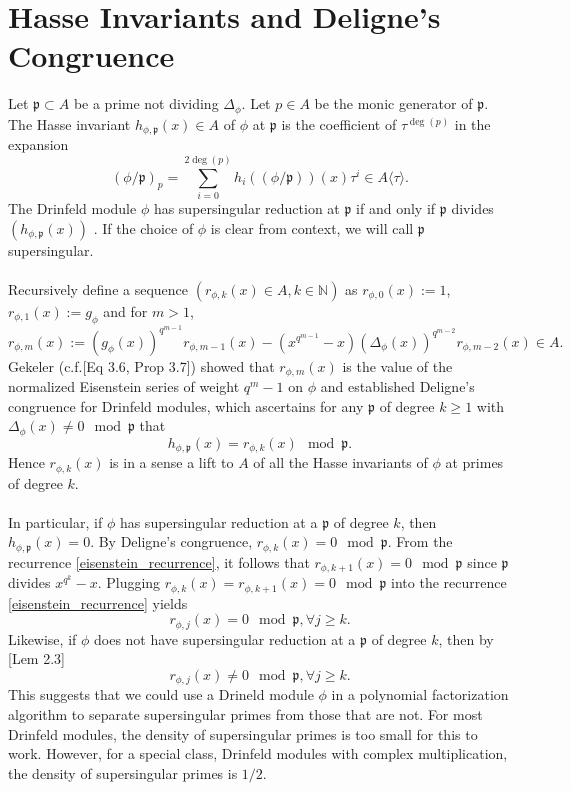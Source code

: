\documentclass{article}
\theoremstyle{plain}
\theoremstyle{definition}
\newcommand{\D}{\Delta}
\newcommand{\ph}{(\phi/\p)}
\newcommand{\p}{\mathfrak p}
\begin{document}
\section{Hasse Invariants and Deligne's Congruence}
Let $\p \subset A$ be a prime not dividing $\Delta_\phi$. Let $p \in A$ be the monic generator of $\p$. The Hasse invariant $h_{\phi,\p}(x) \in A$ of $\phi$ at $\p$ is the coefficient of $\tau^{\deg(p)}$ in the expansion $$\ph_p  = \sum_{i=0}^{2\deg(p)} h_i(\ph)(x) \tau^i \in A\langle \tau \rangle.$$
The Drinfeld module $\phi$ has supersingular reduction at $\p$ if and only if $\p$ divides $(h_{\phi,\p}(x))$ \cite{gos}. If the choice of $\phi$ is clear from context, we will call $\p$ supersingular.\\ \\
Recursively define a sequence $(r_{\phi,k}(x) \in A,k \in \mathbb{N})$ as $r_{\phi,0}(x):=1$, $r_{\phi,1}(x):=g_\phi$ and for $m>1$,
\begin{equation}\label{eisenstein_recurrence}
r_{\phi,m}(x) := \left(g_\phi(x)\right)^{q^{m-1}}r_{\phi,m-1}(x) - (x^{q^{m-1}}-x) \left(\D_\phi(x)\right)^{q^{m-2}} r_{\phi,m-2}(x) \in A.
\end{equation}
Gekeler (c.f.\cite{gek}[Eq 3.6, Prop 3.7]) showed that $r_{\phi,m}(x)$ is the value of the normalized Eisenstein series of weight $q^{m}-1$ on $\phi$ and established Deligne's congruence for Drinfeld modules, which ascertains for any $\p$ of degree $k \geq 1$ with $\Delta_\phi(x) \neq 0 \mod \p$ that 
\begin{equation}\label{deligne_congruence}
 h_{\phi,\p}(x) = r_{\phi,k}(x) \mod \p.
\end{equation}
Hence $r_{\phi,k}(x)$ is in a sense a lift to $A$ of all the Hasse invariants of $\phi$ at primes of degree $k$.\\ \\
In particular, if $\phi$ has supersingular reduction at a $\p$ of degree $k$, then $h_{\phi,\p}(x)=0$. By Deligne's congruence, $r_{\phi,k}(x) = 0 \mod \p$. From the recurrence \ref{eisenstein_recurrence}, it follows that $r_{\phi,k+1}(x) = 0 \mod \p$ since $\p$ divides $x^{q^k}-x$. Plugging $r_{\phi,k}(x) = r_{\phi,k+1}(x)= 0 \mod \p$ into the recurrence \ref{eisenstein_recurrence} yields  
\begin{equation}\label{supersingular_zero}
 r_{\phi,j}(x) = 0 \mod \p , \forall j \geq k.
\end{equation}
Likewise, if $\phi$ does not have supersingular reduction at a $\p$ of degree $k$, then by \cite{cor}[Lem 2.3]
\begin{equation}\label{supersingular_nonzero}
 r_{\phi,j}(x) \neq 0 \mod \p , \forall j \geq k.
\end{equation}
This suggests that we could use a Drineld module $\phi$ in a polynomial factorization algorithm to separate supersingular primes from those that are not. For most Drinfeld modules, the density of supersingular primes is too small for this to work. However, for a special class, Drinfeld modules with complex multiplication, the density of supersingular primes is $1/2$. 
\end{document}
